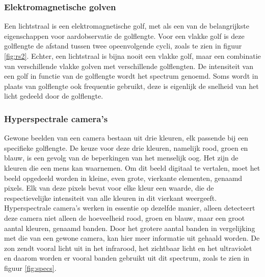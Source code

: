 \documentclass[12pt]{report}
\begin{document}

\subsubsection{Elektromagnetische golven}
Een lichtstraal is een elektromagnetische golf, met als een van de belangrijkste eigenschappen voor aardobservatie de golflengte. Voor een vlakke golf is deze golflengte de afstand tussen twee opeenvolgende cycli, zoals te zien in figuur \ref{fig:rs2}. Echter, een lichtstraal is bijna nooit een vlakke golf, maar een combinatie van verschillende vlakke golven met verschillende golflengten. De intensiteit van een golf in functie van de golflengte wordt het spectrum genoemd. Soms wordt in plaats van golflengte ook frequentie gebruikt, deze is eigenlijk de snelheid van het licht gedeeld door de golflengte.

\subsubsection{Hyperspectrale camera's}
Gewone beelden van een camera bestaan uit drie kleuren, elk passende bij een specifieke golflengte. De keuze voor deze drie kleuren, namelijk rood, groen en blauw, is een gevolg van de beperkingen van het menselijk oog. Het zijn de kleuren die een mens kan waarnemen. Om dit beeld digitaal te vertalen, moet het beeld opgedeeld worden in kleine, even grote, vierkante elementen, genaamd pixels. Elk van deze pixels bevat voor elke kleur een waarde, die de respectievelijke intensiteit van alle kleuren in dit vierkant weergeeft. Hyperspectrale camera's werken in essentie op dezelfde manier, alleen detecteert deze camera niet alleen de hoeveelheid rood, groen en blauw, maar een groot aantal kleuren, genaamd banden. Door het grotere aantal banden in vergelijking met die van een gewone camera, kan hier meer informatie uit gehaald worden. De zon zendt vooral licht uit in het infrarood, het zichtbaar licht en het ultraviolet en daarom worden er vooral banden gebruikt uit dit spectrum, zoals te zien in figuur \ref{fig:specs}.
\end{document}

